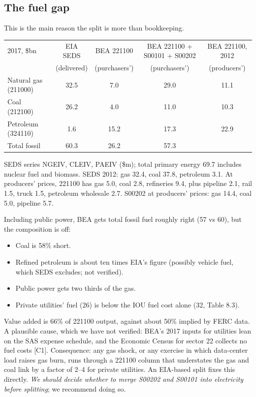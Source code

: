 \documentclass[11pt]{article}
\newcommand{\bn}{\$bn}
\begin{document}
\subsection{The fuel gap}\label{sec:gap}
This is the main reason the split is more than bookkeeping.
\begin{center}\small
\begin{threeparttable}
\begin{tabular}{lcccc}
\toprule
2017, \bn & EIA SEDS & BEA 221100 & BEA 221100 + S00101 + S00202 & BEA 221100, 2012 \\
 & (delivered) & (purchasers') & (purchasers') & (producers') \\
\midrule
Natural gas (211000) & 32.5 & 7.0 & 29.0 & 11.1 \\
Coal (212100) & 26.2 & 4.0 & 11.0 & 10.3 \\
Petroleum (324110) & 1.6 & 15.2 & 17.3 & 22.9 \\
Total fossil & 60.3 & 26.2 & 57.3 & \\
\bottomrule
\end{tabular}
\begin{tablenotes}\footnotesize
\item SEDS series NGEIV, CLEIV, PAEIV (\$m); total primary energy 69.7 includes nuclear fuel and biomass. SEDS 2012: gas 32.4, coal 37.8, petroleum 3.1. At producers' prices, 221100 has gas 5.0, coal 2.8, refineries 9.4, plus pipeline 2.1, rail 1.5, truck 1.5, petroleum wholesale 2.7. S00202 at producers' prices: gas 14.4, coal 5.0, pipeline 5.7.
\end{tablenotes}
\end{threeparttable}
\end{center}
Including public power, BEA gets total fossil fuel roughly right (57 vs 60), but the composition is off:
\begin{itemize}
  \item Coal is 58\% short.
  \item Refined petroleum is about ten times EIA's figure (possibly vehicle fuel, which SEDS excludes; not verified).
  \item Public power gets two thirds of the gas.
  \item Private utilities' fuel (26) is below the IOU fuel cost alone (32, Table 8.3).
\end{itemize}
Value added is 66\% of 221100 output, against about 50\% implied by FERC data. A plausible cause, which we have not verified: BEA's 2017 inputs for utilities lean on the SAS expense schedule, and the Economic Census for sector 22 collects no fuel costs [C1]. Consequence: any gas shock, or any exercise in which data-center load raises gas burn, runs through a 221100 column that understates the gas and coal link by a factor of 2--4 for private utilities. An EIA-based split fixes this directly. \emph{We should decide whether to merge S00202 and S00101 into electricity before splitting}; we recommend doing so.
\end{document}
